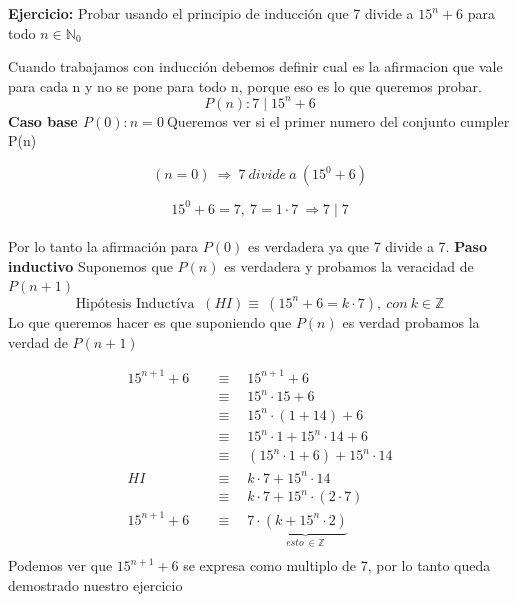 \documentclass[12pt]{book}
\begin{document}
\begin{shaded}
\textbf{Ejercicio:} Probar usando el principio de inducción que 7 divide a $ 15^{n} + 6$ para todo $n \in \mathbb N_{0}$  
\end{shaded}

Cuando trabajamos con inducci\'on debemos definir cual es la afirmacion que vale para cada n   y no se pone para todo n, porque eso es lo que queremos probar.\\
\[
 P(n): 7 \mid 15^{n} + 6
\]
\newline
\textbf{Caso base $P(0): n = 0  \ $}\quad Queremos ver si el primer numero del conjunto cumpler P(n)

\[
(n=0 ) \ \Rightarrow \ 7 \ divide \ a \ (15^{0} + 6 )
\]

\[  15^{0} + 6 = 7  , \  7 = 1 \cdot 7  \ \Rightarrow 7\mid 7 \]
\\
Por lo tanto la afirmaci\'on para $P(0)$  es verdadera ya que 7 divide a 7.
\newline
\newline
\textbf{Paso inductivo} Suponemos que $P(n)$ es verdadera y probamos la veracidad de $P(n+1)$
\[
\text {Hip\'otesis  Induct\'iva } \ (HI) \equiv \ (15^{n} + 6 = k \cdot 7) ,\ con \ k \in \mathbb{Z} 
\]
\newline
Lo que queremos hacer es que suponiendo que $P(n)$ es verdad probamos la verdad de $P(n+1)$

\begin{equation*}
\begin{split}
15^{n+1} + 6 \quad   &\equiv \quad  15^{n+1} + 6   \\
&\equiv  \quad   15^{n} \cdot 15 + 6  \\
&\equiv  \quad   15^{n} \cdot (1 + 14) + 6 \\
&\equiv  \quad   15^{n} \cdot 1 + 15^{n} \cdot 14 + 6 \\ 
&\equiv  \quad   (15^{n} \cdot 1 + 6) +15^{n} \cdot 14  \\
HI \quad   &\equiv  \quad   k \cdot 7 +15^{n} \cdot 14  \\
\quad   &\equiv  \quad   k \cdot 7 +15^{n} \cdot (2 \cdot 7)  \\
15^{n+1} + 6 \quad   &\equiv  \quad  7 \cdot \underbrace{ (k +15^{n} \cdot 2)}_{ esto \ \in \mathbb{Z}}  \\
\end{split}
\end{equation*}
Podemos ver que $ 15^{n+1} + 6  $ se expresa como multiplo de 7, por lo tanto queda demostrado nuestro ejercicio
\end{document}
